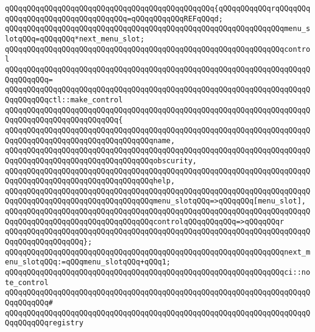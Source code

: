 \verb|qQQqqQQqqQQqqQQqqQQqqQQqqQQqqQQqqQQqqQQqqQQqqQQq{qQQqqQQqqQQqrqQQqqQQqqQQqqQQqqQQqqQQqqQQqqQQqqQQq=qQQqqQQqqQQqREFqQQqd;|\newline
\verb|qQQqqQQqqQQqqQQqqQQqqQQqqQQqqQQqqQQqqQQqqQQqqQQqqQQqqQQqqQQqqQQqmenu_slotqQQq=qQQqqQQq*next_menu_slot;|\newline
\newline
\verb|qQQqqQQqqQQqqQQqqQQqqQQqqQQqqQQqqQQqqQQqqQQqqQQqqQQqqQQqqQQqqQQqcontrol|\newline
\verb|qQQqqQQqqQQqqQQqqQQqqQQqqQQqqQQqqQQqqQQqqQQqqQQqqQQqqQQqqQQqqQQqqQQqqQQqqQQqqQQq=|\newline
\verb|qQQqqQQqqQQqqQQqqQQqqQQqqQQqqQQqqQQqqQQqqQQqqQQqqQQqqQQqqQQqqQQqqQQqqQQqqQQqqQQqctl::make_control|\newline
\verb|qQQqqQQqqQQqqQQqqQQqqQQqqQQqqQQqqQQqqQQqqQQqqQQqqQQqqQQqqQQqqQQqqQQqqQQqqQQqqQQqqQQqqQQqqQQqqQQq{|\newline
\verb|qQQqqQQqqQQqqQQqqQQqqQQqqQQqqQQqqQQqqQQqqQQqqQQqqQQqqQQqqQQqqQQqqQQqqQQqqQQqqQQqqQQqqQQqqQQqqQQqqQQqqQQqname,|\newline
\verb|qQQqqQQqqQQqqQQqqQQqqQQqqQQqqQQqqQQqqQQqqQQqqQQqqQQqqQQqqQQqqQQqqQQqqQQqqQQqqQQqqQQqqQQqqQQqqQQqqQQqqQQqobscurity,|\newline
\verb|qQQqqQQqqQQqqQQqqQQqqQQqqQQqqQQqqQQqqQQqqQQqqQQqqQQqqQQqqQQqqQQqqQQqqQQqqQQqqQQqqQQqqQQqqQQqqQQqqQQqqQQqhelp,|\newline
\verb|qQQqqQQqqQQqqQQqqQQqqQQqqQQqqQQqqQQqqQQqqQQqqQQqqQQqqQQqqQQqqQQqqQQqqQQqqQQqqQQqqQQqqQQqqQQqqQQqqQQqqQQqmenu_slotqQQq=>qQQqqQQq[menu_slot],|\newline
\verb|qQQqqQQqqQQqqQQqqQQqqQQqqQQqqQQqqQQqqQQqqQQqqQQqqQQqqQQqqQQqqQQqqQQqqQQqqQQqqQQqqQQqqQQqqQQqqQQqqQQqqQQqcontrolqQQqqQQqqQQq=>qQQqqQQqr|\newline
\verb|qQQqqQQqqQQqqQQqqQQqqQQqqQQqqQQqqQQqqQQqqQQqqQQqqQQqqQQqqQQqqQQqqQQqqQQqqQQqqQQqqQQqqQQq};|\newline
\newline
\verb|qQQqqQQqqQQqqQQqqQQqqQQqqQQqqQQqqQQqqQQqqQQqqQQqqQQqqQQqqQQqqQQqnext_menu_slotqQQq:=qQQqmenu_slotqQQq+qQQq1;|\newline
\newline
\verb|qQQqqQQqqQQqqQQqqQQqqQQqqQQqqQQqqQQqqQQqqQQqqQQqqQQqqQQqqQQqqQQqci::note_control|\newline
\verb|qQQqqQQqqQQqqQQqqQQqqQQqqQQqqQQqqQQqqQQqqQQqqQQqqQQqqQQqqQQqqQQqqQQqqQQqqQQqqQQq#|\newline
\verb|qQQqqQQqqQQqqQQqqQQqqQQqqQQqqQQqqQQqqQQqqQQqqQQqqQQqqQQqqQQqqQQqqQQqqQQqqQQqqQQqregistry|\newline
